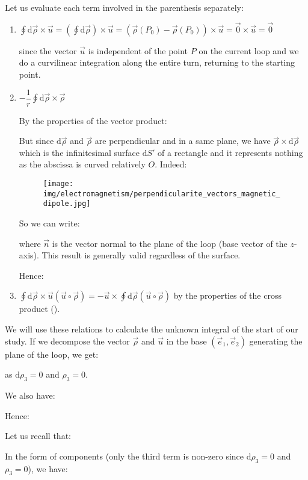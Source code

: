 	Let us evaluate each term involved in the parenthesis separately:
	\begin{enumerate}
		\item $\displaystyle\oint\mathrm{d}\vec{\rho}\times\vec{u}=\left(\oint\mathrm{d}\vec{\rho}\right)\times\vec{u}=\left(\vec{\rho}(P_0)-\vec{\rho}(P_0)\right)\times\vec{u}=\vec{0}\times\vec{u}=\vec{0}$

	since the vector $\vec{u}$ is independent of the point $P$ on the current loop and we do a curvilinear integration along the entire turn, returning to the starting point.

		\item $-\displaystyle\dfrac{1}{r}\oint \mathrm{d}\vec{\rho}\times\vec{\rho}$

		By the properties of the vector product:
		
		But since $\mathrm{d}\vec{\rho}$ and $\vec{\rho}$ are perpendicular and in a same plane, we have $\vec{\rho}\times\mathrm{d}\vec{\rho}$ which is the infinitesimal surface $\mathrm{d}S'$ of a rectangle and it represents nothing as the 
abscissa is curved relatively $O$. Indeed:
		\begin{figure}[H]
			\centering
			\texttt{[image: img/electromagnetism/perpendicularite\_vectors\_magnetic\_dipole.jpg]}
		\end{figure}
		So we can write:
		
		where $\vec{n}$ is the vector normal to the plane of the loop (base vector of the $z$-axis). This result is generally valid regardless of the surface.

		Hence:
		
		
		\item $\displaystyle\oint\mathrm{d}\vec{\rho}\times\vec{u}(\vec{u}\circ\vec{\rho})=-\vec{u}\times\oint\mathrm{d}\vec{\rho}(\vec{u}\circ\vec{\rho})$ by the properties of the cross product ().
	\end{enumerate}
	We will use these relations to calculate the unknown integral of the start of our study. If we decompose the vector $\vec{\rho}$ and $\vec{u}$ in the base $(\vec{e}_1,\vec{e}_2)$ generating the plane of the loop, we get:
	
	as $\mathrm{d}\rho_3=0$ and $\rho_3=0$.

	We also have:
	
	Hence:
	
	Let us recall that:
	
	In the form of components (only the third term is non-zero since $\mathrm{d}\rho_3=0$ and $\rho_3=0$), we have:
	
